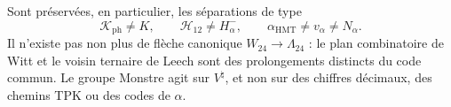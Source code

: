 Sont préservées, en particulier, les séparations de type
\[
 \mathcal K_{\mathrm{ph}}\neq K,\qquad
 \mathcal H_{12}\neq H^-_\alpha,\qquad
 \alpha_{\mathrm{HMT}}\neq v_\alpha\neq N_\alpha.
\]
Il n'existe pas non plus de flèche canonique \(W_{24}\to\Lambda_{24}\) : le plan combinatoire de Witt et le voisin ternaire de Leech sont des prolongements distincts du code commun. Le groupe Monstre agit sur \(V^\natural\), et non sur des chiffres décimaux, des chemins TPK ou des codes de \(\alpha\).
